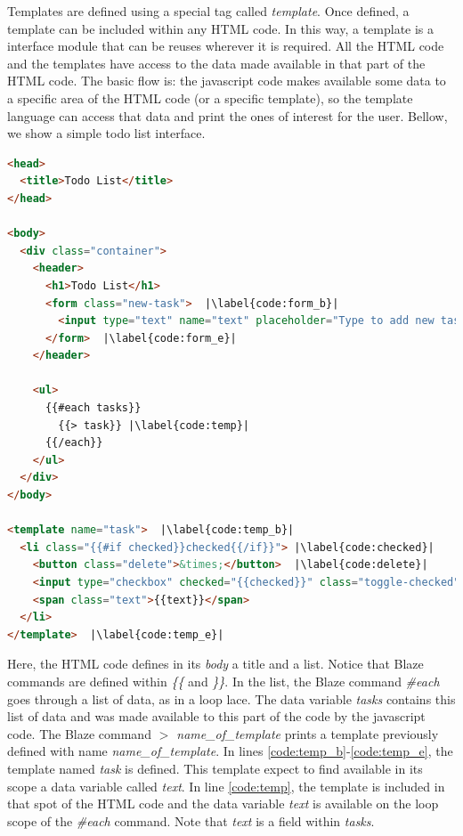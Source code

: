 Templates are defined using a special tag called \emph{template}.
Once defined, a template can be included within any HTML code.
In this way, a template is a interface module that can be reuses wherever it is required.
All the HTML code and the templates have access to the data made available in that part of the HTML code.
The basic flow is: the javascript code makes available some data to a specific area of the HTML code (or a specific template), so the template language can access that data and print the ones of interest for the user.
Bellow, we show a simple todo list interface.

\begin{lstlisting}[language=html,escapechar=|]
<head>
  <title>Todo List</title>
</head>
 
<body>
  <div class="container">
    <header>
      <h1>Todo List</h1>
      <form class="new-task">  |\label{code:form_b}|
        <input type="text" name="text" placeholder="Type to add new tasks" />
      </form>  |\label{code:form_e}|
    </header>
 
    <ul>
      {{#each tasks}}
        {{> task}} |\label{code:temp}|
      {{/each}}
    </ul>
  </div>
</body>
 
<template name="task">  |\label{code:temp_b}|
  <li class="{{#if checked}}checked{{/if}}"> |\label{code:checked}|
    <button class="delete">&times;</button>  |\label{code:delete}|
    <input type="checkbox" checked="{{checked}}" class="toggle-checked" />
    <span class="text">{{text}}</span>
  </li>
</template>  |\label{code:temp_e}|
\end{lstlisting}

Here, the HTML code defines in its \emph{body} a title and a list.
Notice that Blaze commands are defined within \emph{\{\{} and \emph{\}\}}.
In the list, the Blaze command \emph{\#each} goes through a list of data, as in a loop lace.
The data variable \emph{tasks} contains this list of data and was made available to this part of the code by the javascript code.
The Blaze command \emph{$>$ name\_of\_template} prints a template previously defined with name \emph{name\_of\_template}.
In lines \ref{code:temp_b}-\ref{code:temp_e}, the template named \emph{task} is defined.
This template expect to find available in its scope a data variable called \emph{text}.
In line \ref{code:temp}, the template is included in that spot of the HTML code and the data variable \emph{text} is available on the loop scope of the \emph{\#each} command.
Note that \emph{text} is a field within \emph{tasks}.


